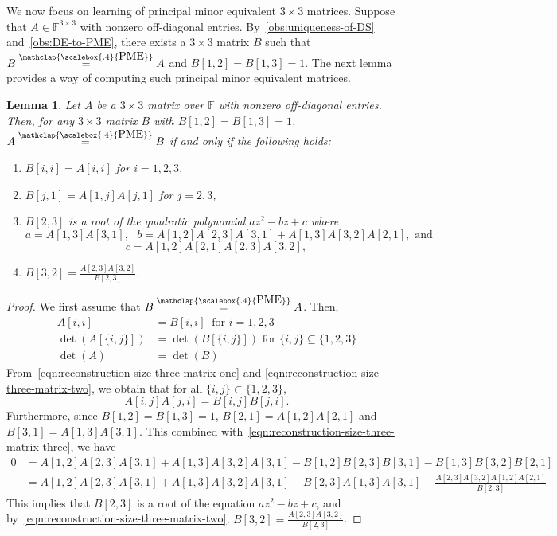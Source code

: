 \documentclass[11pt,letterpaper]{article}
\newcommand{\F}{\mathbb{F}}
\newtheorem{lemma}{Lemma}[section]
\newcommand{\PME}{\stackrel{\mathclap{\scalebox{.4}{\mbox{PME}}}}{=}}
\begin{document}
{{{We now focus on learning of principal minor equivalent $3\times 3$ matrices. Suppose that $A\in\F^{3\times 3}$ with nonzero off-diagonal entries. By~\cref{obs:uniqueness-of-DS} and~\cref{obs:DE-to-PME}, there exists a $3\times 3$ matrix $B$ such that $B\PME A$ and $B[1,2]=B[1,3]=1$. The next lemma provides a way of computing such principal minor equivalent matrices. 
\begin{lemma}
\label{lem:reconstruction-size-three-matrix}
Let $A$ be a $3\times 3$ matrix over $\F$ with nonzero off-diagonal entries. Then, for any $3\times 3$ matrix $B$ with $B[1,2]=B[1,3]=1$, $A\PME B$ if and only if the following holds: 
\begin{enumerate}
\item $B[i,i]=A[i,i]$ for $i=1,2,3$, 
\item $B[j, 1]=A[1,j]A[j,1]$ for $j=2,3$, 
\item $B[2,3]$ is a root of the quadratic polynomial $az^2-bz+c$ where
 $$a=A[1,3]A[3,1],\ \ \ b=A[1,2]A[2,3]A[3,1]+A[1,3]A[3,2]A[2,1], \text{ and }$$  $$c=A[1,2]A[2,1]A[2,3]A[3,2],$$ 
\item $B[3,2]=\frac{A[2,3]A[3,2]}{B[2,3]}.$
\end{enumerate}
\end{lemma}
\begin{proof}
We first assume that $B\PME A$. Then, 
\begin{align}
A[i,i] &= B[i,i] \ \text{ for } i=1,2,3\label{eqn:reconstruction-size-three-matrix-one}\\
\det(A[\{i,j\}]) &= \det(B[\{i,j\}]) \text{ for } \{i, j\}\subseteq \{1,2,3\} \label{eqn:reconstruction-size-three-matrix-two}\\
\det(A) &=\det(B)\label{eqn:reconstruction-size-three-matrix-three}
\end{align}
From~\cref{eqn:reconstruction-size-three-matrix-one} and \cref{eqn:reconstruction-size-three-matrix-two}, we obtain that for all $\{i, j\}\subset\{1,2,3\}$, $$A[i,j]A[j,i]=B[i,j]B[j,i].$$
Furthermore, since $B[1,2]=B[1,3] = 1$, $B[2,1] = A[1,2]A[2,1]$ and $B[3,1]=A[1,3]A[3,1]$. This combined with~\cref{eqn:reconstruction-size-three-matrix-three}, we have 
\begin{align*}
0 &= A[1,2]A[2,3]A[3,1]+A[1,3]A[3,2]A[3,1]-B[1,2]B[2,3]B[3,1]-B[1,3]B[3,2]B[2,1]\\
&=A[1,2]A[2,3]A[3,1]+A[1,3]A[3,2]A[3,1]-B[2,3]A[1,3]A[3,1]-\frac{A[2,3]A[3,2]A[1,2]A[2,1]}{B[2,3]}
\end{align*}
This implies that $B[2,3]$ is a root of the equation $az^2-bz+c$, and by~\cref{eqn:reconstruction-size-three-matrix-two}, $B[3,2]=\frac{A[2,3]A[3,2]}{B[2,3]}$.


\end{proof}}}}
\end{document}
